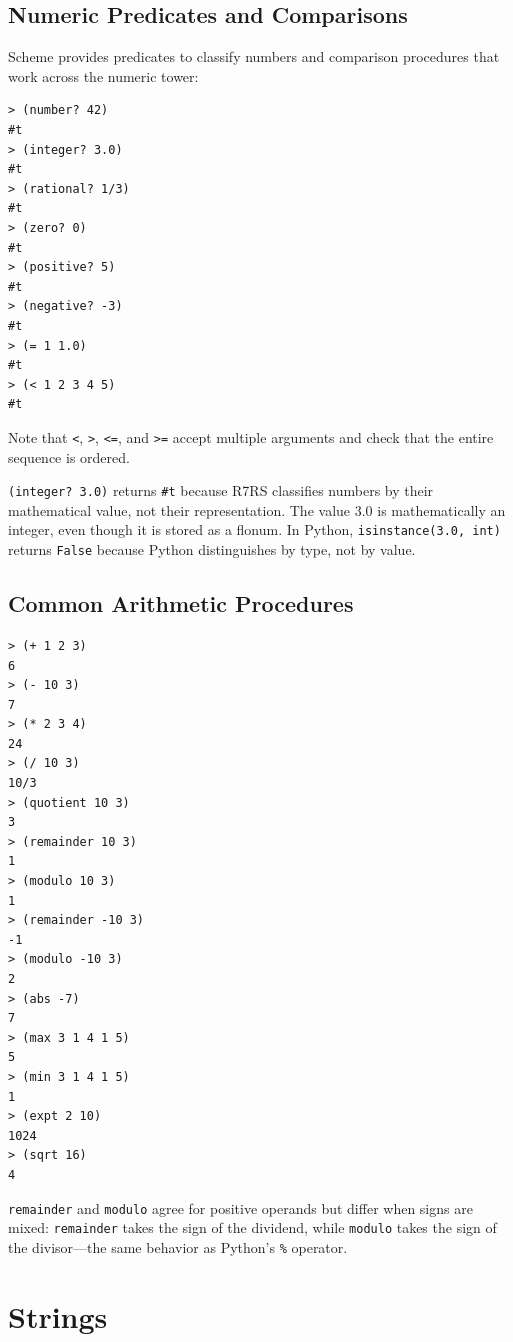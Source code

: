 \subsection{Numeric Predicates and Comparisons}

Scheme provides predicates to classify numbers and comparison procedures that work across the numeric tower:

\begin{lstlisting}[style=repl]
> (number? 42)
#t
> (integer? 3.0)
#t
> (rational? 1/3)
#t
> (zero? 0)
#t
> (positive? 5)
#t
> (negative? -3)
#t
> (= 1 1.0)
#t
> (< 1 2 3 4 5)
#t
\end{lstlisting}

Note that \texttt{<}, \texttt{>}, \texttt{<=}, and \texttt{>=} accept multiple arguments and check that the entire sequence is ordered.

\begin{note}
\texttt{(integer? 3.0)} returns \texttt{\#t} because R7RS classifies numbers by their mathematical value, not their representation. The value 3.0 is mathematically an integer, even though it is stored as a flonum. In Python, \texttt{isinstance(3.0, int)} returns \texttt{False} because Python distinguishes by type, not by value.
\end{note}

\subsection{Common Arithmetic Procedures}

\begin{lstlisting}[style=repl]
> (+ 1 2 3)
6
> (- 10 3)
7
> (* 2 3 4)
24
> (/ 10 3)
10/3
> (quotient 10 3)
3
> (remainder 10 3)
1
> (modulo 10 3)
1
> (remainder -10 3)
-1
> (modulo -10 3)
2
> (abs -7)
7
> (max 3 1 4 1 5)
5
> (min 3 1 4 1 5)
1
> (expt 2 10)
1024
> (sqrt 16)
4
\end{lstlisting}

\texttt{remainder} and \texttt{modulo} agree for positive operands but differ when signs are mixed: \texttt{remainder} takes the sign of the dividend, while \texttt{modulo} takes the sign of the divisor---the same behavior as Python's \texttt{\%} operator.

\section{Strings}

